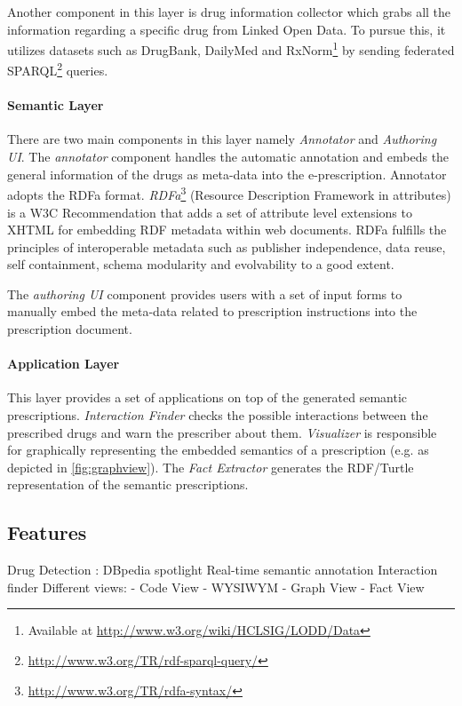 \documentclass[10pt, conference, compsocconf]{IEEEtran}
\begin{document}
Another component in this layer is drug information collector which grabs all the information regarding a specific drug from Linked Open Data.
To pursue this, it utilizes datasets such as DrugBank, DailyMed and RxNorm\footnote{Available at \url{http://www.w3.org/wiki/HCLSIG/LODD/Data}} by sending federated SPARQL\footnote{\url{http://www.w3.org/TR/rdf-sparql-query/}} queries.

\paragraph{Semantic Layer}
There are two main components in this layer namely \emph{Annotator} and \emph{Authoring UI}.
The \emph{annotator} component handles the automatic annotation and embeds the general information of the drugs as meta-data into the e-prescription.
Annotator adopts the RDFa format. \emph{RDFa}\footnote{\url{http://www.w3.org/TR/rdfa-syntax/}} (Resource Description Framework in attributes) is a W3C Recommendation that adds a set of attribute level extensions to XHTML for embedding RDF metadata within web documents.
RDFa fulfills the principles of interoperable metadata such as publisher independence, data reuse, self containment, schema modularity and evolvability to a good extent.

The \emph{authoring UI} component provides users with a set of input forms to manually embed the meta-data related to prescription instructions into the prescription document.

\paragraph{Application Layer}
This layer provides a set of applications on top of the generated semantic prescriptions.
\emph{Interaction Finder} checks the possible interactions between the prescribed drugs and warn the prescriber about them.
\emph{Visualizer} is responsible for graphically representing the embedded semantics of a prescription (e.g. as depicted in \autoref{fig:graphview}).
The \emph{Fact Extractor} generates the RDF/Turtle representation of the semantic prescriptions.


\subsection{Features}
Drug Detection : DBpedia spotlight
Real-time semantic annotation
Interaction finder
Different views:
- Code View
- WYSIWYM
- Graph View
- Fact View
\end{document}
